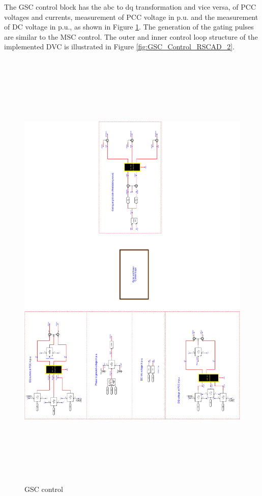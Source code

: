 The \gls{GSC} control block has the abc to \gls{dq} transformation and vice versa, of \gls{PCC} voltages and currents, measurement of \gls{PCC} voltage in p.u. and the measurement of \gls{DC} voltage in p.u., as shown in Figure \ref{fig:GSC_Control_RSCAD_1}. The generation of the gating pulses are similar to the \gls{MSC} control. The outer and inner control loop structure of the implemented \gls{DVC} is illustrated in Figure \ref{fig:GSC_Control_RSCAD_2}.

\begin{figure}[H]
\centering
    \includegraphics[height = 22cm,width = 14.5cm]{Diagrams/Appendix_A/GSC_Control_RSCAD_1.pdf}
    \caption{GSC control}
    \label{fig:GSC_Control_RSCAD_1}
\end{figure}

